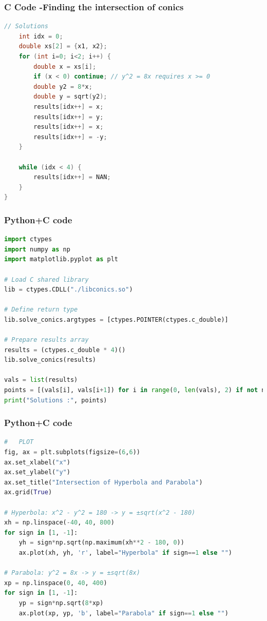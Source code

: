 \documentclass{beamer}
\begin{document}
\begin{frame}[fragile]
    \frametitle{C Code -Finding the intersection of conics}

    \begin{lstlisting}[language=C]
    // Solutions
    int idx = 0;
    double xs[2] = {x1, x2};
    for (int i=0; i<2; i++) {
        double x = xs[i];
        if (x < 0) continue; // y^2 = 8x requires x >= 0
        double y2 = 8*x;
        double y = sqrt(y2);
        results[idx++] = x;
        results[idx++] = y;
        results[idx++] = x;
        results[idx++] = -y;
    }

    while (idx < 4) {
        results[idx++] = NAN;
    }
}
    \end{lstlisting}
\end{frame}




\begin{frame}[fragile]
    \frametitle{Python+C code}

    \begin{lstlisting}[language=Python]
import ctypes
import numpy as np
import matplotlib.pyplot as plt

# Load C shared library
lib = ctypes.CDLL("./libconics.so")

# Define return type
lib.solve_conics.argtypes = [ctypes.POINTER(ctypes.c_double)]

# Prepare results array
results = (ctypes.c_double * 4)()
lib.solve_conics(results)

vals = list(results)
points = [(vals[i], vals[i+1]) for i in range(0, len(vals), 2) if not np.isnan(vals[i])]
print("Solutions :", points)

    \end{lstlisting}
\end{frame}

\begin{frame}[fragile]
    \frametitle{Python+C code}

    \begin{lstlisting}[language=Python]
#   PLOT
fig, ax = plt.subplots(figsize=(6,6))
ax.set_xlabel("x")
ax.set_ylabel("y")
ax.set_title("Intersection of Hyperbola and Parabola")
ax.grid(True)

# Hyperbola: x^2 - y^2 = 180 -> y = ±sqrt(x^2 - 180)
xh = np.linspace(-40, 40, 800)
for sign in [1, -1]:
    yh = sign*np.sqrt(np.maximum(xh**2 - 180, 0))
    ax.plot(xh, yh, 'r', label="Hyperbola" if sign==1 else "")

# Parabola: y^2 = 8x -> y = ±sqrt(8x)
xp = np.linspace(0, 40, 400)
for sign in [1, -1]:
    yp = sign*np.sqrt(8*xp)
    ax.plot(xp, yp, 'b', label="Parabola" if sign==1 else "")

    \end{lstlisting}
\end{frame}
\end{document}
